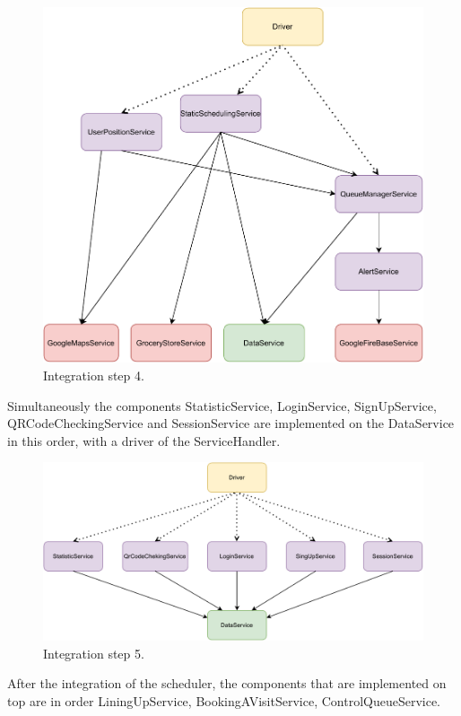 \begin{figure}[H]
    \centering
    \includegraphics[width=1.0\textwidth]{images/component4.pdf}
    \caption{Integration step 4.}
\end{figure}

Simultaneously the components StatisticService, LoginService, SignUpService, QRCodeCheckingService and SessionService are implemented on the DataService in this order, with a driver of the ServiceHandler.

\begin{figure}[H]
    \centering
    \includegraphics[width=1.0\textwidth]{images/component5.pdf}
    \caption{Integration step 5.}
\end{figure}

After the integration of the scheduler, the components that are implemented on top are in order LiningUpService, BookingAVisitService, ControlQueueService.

